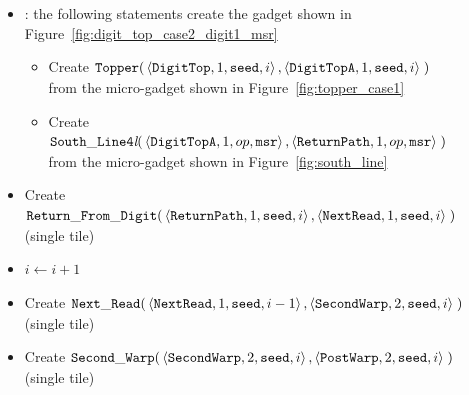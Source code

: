 \begin{itemize}
    \item {\dtop}: the following statements create the gadget shown in Figure~\ref{fig:digit_top_case2_digit1_msr}
    \begin{itemize}
        \item Create
        $\begin{aligned}[t]
            {\tt Topper}(&\left\langle {\tt DigitTop},  1, {\tt seed}, i \right\rangle,
                          \left\langle {\tt DigitTopA}, 1, {\tt seed}, i \right\rangle \;)
        \end{aligned}$\\from the micro-gadget shown in Figure~\ref{fig:topper_case1}
        \item Create
        $\begin{aligned}[t]
            {\tt South\_Line4\textit{l}}(&\left\langle {\tt DigitTopA}, 1, op, {\tt msr}\right\rangle,
                                          \left\langle {\tt ReturnPath},     1, op, {\tt msr}\right\rangle \;)
        \end{aligned}$\\from the micro-gadget shown in Figure~\ref{fig:south_line}
    \end{itemize}

    \item Create
    $\begin{aligned}[t]
            {\tt Return\_From\_Digit}(&\left\langle {\tt ReturnPath},    1, {\tt seed}, i \right\rangle,
                              \left\langle {\tt NextRead}, 1, {\tt seed}, i \right\rangle \;)
    \end{aligned}$\\ (single tile)

    \item $i \gets i + 1$

    \item Create
    $\begin{aligned}[t]
            {\tt Next\_Read}(&\left\langle {\tt NextRead},   1, {\tt seed}, i-1 \right\rangle,
                       \left\langle {\tt SecondWarp}, 2, {\tt seed}, i   \right\rangle \;)
    \end{aligned}$\\ (single tile)


    \item Create
    $\begin{aligned}[t]
        {\tt Second\_Warp}(&\left\langle {\tt SecondWarp}, 2, {\tt seed}, i \right\rangle,
                     \left\langle {\tt PostWarp},   2, {\tt seed}, i \right\rangle \;)
    \end{aligned}$ \\ (single tile)


\end{itemize}
